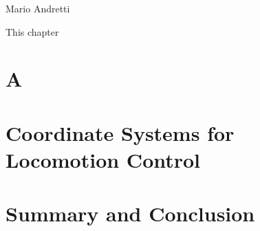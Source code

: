        {Mario Andretti}

This chapter 

\chapterSupportedBy{\controlCitesLong}







\section{A}
\label{sec:control:Structure}
%
\lipsum


\section{Coordinate Systems for Locomotion Control}
\label{sec:control:kinematicsConsiderations}
%


\section{Summary and Conclusion}
\label{sec:control:Conclusion}



